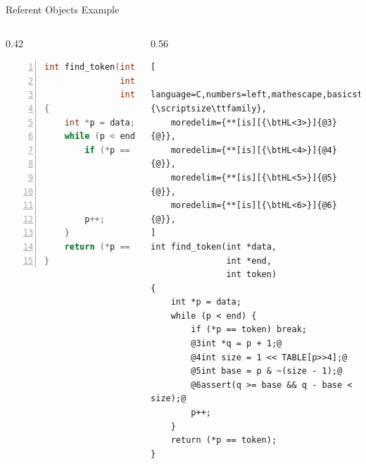 \documentclass[aspectratio=169]{beamer}
\begin{document}
\begin{frame}[fragile]{Referent Objects Example}
\footnotesize
\begin{columns}[T]
\begin{column}{0.42\textwidth}
\begin{lstlisting}[language=C,numbers=left,mathescape,basicstyle={\scriptsize\ttfamily}]
int find_token(int *data,
               int *end,
               int token)
{
    int *p = data;
    while (p < end) {
        if (*p == token) break;




        p++;
    }
    return (*p == token);
}
\end{lstlisting}
\end{column}

\pause

\begin{column}{0.56\textwidth}
\begin{lstlisting}[
    language=C,numbers=left,mathescape,basicstyle={\scriptsize\ttfamily},
    moredelim={**[is][{\btHL<3>}]{@3}{@}},
    moredelim={**[is][{\btHL<4>}]{@4}{@}},
    moredelim={**[is][{\btHL<5>}]{@5}{@}},
    moredelim={**[is][{\btHL<6>}]{@6}{@}},
]
int find_token(int *data,
               int *end,
               int token)
{
    int *p = data;
    while (p < end) {
        if (*p == token) break;
        @3int *q = p + 1;@
        @4int size = 1 << TABLE[p>>4];@
        @5int base = p & ~(size - 1);@
        @6assert(q >= base && q - base < size);@
        p++;
    }
    return (*p == token);
}
\end{lstlisting}
\end{column}

\end{columns}
\end{frame}




\end{document}
